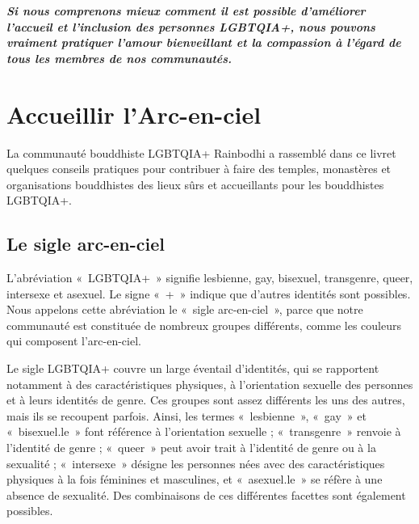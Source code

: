 \documentclass[12pt,openany]{book}
\renewenvironment{quote}{%
  \list{}{%
    \leftmargin-0.1cm   %
    \rightmargin\leftmargin
  }
  \item\relax
}
{\endlist}
\begin{document}
\begingroup
\begin{quote}
\centering
\doublespacing
\textit{\Large \textbf{Si nous comprenons mieux comment il est possible d'améliorer l'accueil et l'inclusion des personnes \mbox{LGBTQIA+}, nous pouvons vraiment pratiquer l'amour bienveillant et la compassion à l'égard de tous les membres de nos communautés.}}
\end{quote}
\endgroup
\color{darkgray}

\setlength{\parindent}{15pt}
\chapter*{Accueillir l’Arc-en-ciel}

\begin{figure}
\end{figure}
\noindent La communauté bouddhiste \mbox{LGBTQIA+} Rainbodhi a rassemblé dans ce livret quelques conseils pratiques pour contribuer à faire des temples, monastères et organisations bouddhistes des lieux sûrs et accueillants pour les bouddhistes \mbox{LGBTQIA+}.

\section*{Le sigle arc-en-ciel}

\noindent L’abréviation \mbox{« \mbox{LGBTQIA+} »} signifie lesbienne, gay, bisexuel, transgenre, queer, intersexe et asexuel. Le signe \mbox{« + »} indique que d’autres identités sont possibles. Nous appelons cette abréviation le \mbox{« s}igle arc-en-cie\mbox{l »}, parce que notre communauté est constituée de nombreux groupes différents, comme les couleurs qui composent l’arc-en-ciel.

Le sigle \mbox{LGBTQIA+} couvre un large éventail d’identités, qui se rapportent notamment à des caractéristiques physiques, à l’orientation sexuelle des personnes et à leurs identités de genre. Ces groupes sont assez différents les uns des autres, mais ils se recoupent parfois.
Ainsi, les termes \mbox{« lesbienne »}, \mbox{« gay »} et \mbox{« bisexuel.le »} font référence à l’orientation sexuelle ; \mbox{« transgenre »} renvoie à l’identité de genre ; \mbox{« queer »} peut avoir trait à l’identité de genre ou à la sexualité ; \mbox{« intersexe »} désigne les personnes nées avec des caractéristiques physiques à la fois féminines et masculines, et \mbox{« asexuel.le »} se réfère à une absence de sexualité. Des combinaisons de ces différentes facettes sont également possibles.
\end{document}
